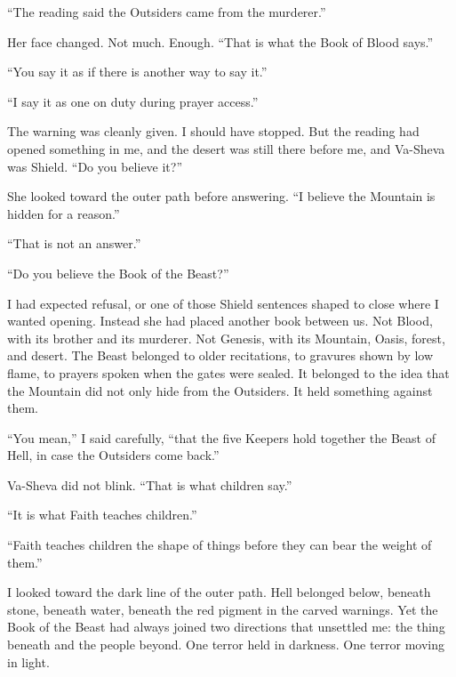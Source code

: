``The reading said the Outsiders came from the murderer.''\par

Her face changed. Not much. Enough. ``That is what the Book of Blood says.''\par

``You say it as if there is another way to say it.''\par

``I say it as one on duty during prayer access.''\par

The warning was cleanly given. I should have stopped. But the reading had opened something in me, and the desert was still there before me, and Va-Sheva was Shield. ``Do you believe it?''\par

She looked toward the outer path before answering. ``I believe the Mountain is hidden for a reason.''\par

``That is not an answer.''\par

``Do you believe the Book of the Beast?''\par

I had expected refusal, or one of those Shield sentences shaped to close where I wanted opening. Instead she had placed another book between us. Not Blood, with its brother and its murderer. Not Genesis, with its Mountain, Oasis, forest, and desert. The Beast belonged to older recitations, to gravures shown by low flame, to prayers spoken when the gates were sealed. It belonged to the idea that the Mountain did not only hide from the Outsiders. It held something against them.\par

``You mean,'' I said carefully, ``that the five Keepers hold together the Beast of Hell, in case the Outsiders come back.''\par

Va-Sheva did not blink. ``That is what children say.''\par

``It is what Faith teaches children.''\par

``Faith teaches children the shape of things before they can bear the weight of them.''\par

I looked toward the dark line of the outer path. Hell belonged below, beneath stone, beneath water, beneath the red pigment in the carved warnings. Yet the Book of the Beast had always joined two directions that unsettled me: the thing beneath and the people beyond. One terror held in darkness. One terror moving in light.\par


